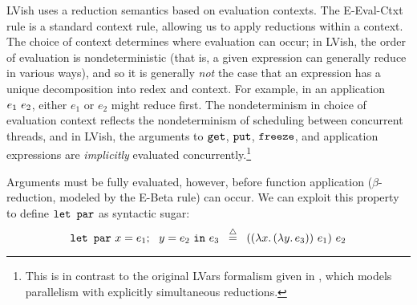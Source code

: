 LVish uses a reduction semantics based on evaluation
contexts. %
The {\sc E-Eval-Ctxt} rule is a standard context rule, allowing us to apply
reductions within a context.  The choice of context determines where evaluation
can occur; in LVish, the order of evaluation is nondeterministic (that is, a
given expression can generally reduce in various ways), and so it is generally
\emph{not} the case that an expression has a unique decomposition into redex and
context.  For example, in an application $e_1~e_2$, either $e_1$ or $e_2$
might reduce first.  The nondeterminism in choice of evaluation context reflects
the nondeterminism of scheduling between concurrent threads, and in LVish,
the arguments to $\mbox{\texttt{get}}$, $\mbox{\texttt{put}}$, $\mbox{\texttt{freeze}}$, and application expressions are
\emph{implicitly} evaluated concurrently.\footnote{This is in contrast to
  the original LVars formalism given in \cite{LVars-paper},
  which models parallelism with explicitly simultaneous
  reductions.}

Arguments must be fully evaluated, however, before function application
($\beta$-reduction, modeled by the {\sc E-Beta} rule) can occur.  We can exploit
this property to define $\mbox{\texttt{\mbox{\texttt{let}}~\mbox{\texttt{par}}}}$ as syntactic sugar:
\[
\mbox{\texttt{\mbox{\texttt{let}}~\mbox{\texttt{par}}}} ~x = e_1;~~y = e_2~\mbox{\texttt{in}}~e_3 \;\;\stackrel{\triangle}{=}\;\;
((\lambda x.\,(\lambda y.\,e_3))~e_1)~e_2
\]

